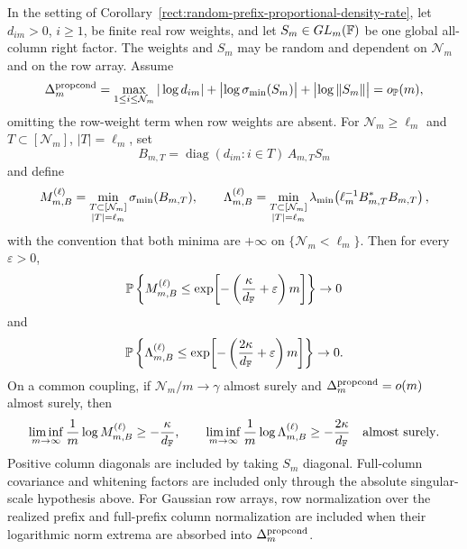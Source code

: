 \begin{corollary}\label{rect:random-prefix-proportional-conditioning-transfer}
In the setting of Corollary~\ref{rect:random-prefix-proportional-density-rate},
let \(d_{im}>0\), \(i\ge1\), be finite real row weights, and let
\(S_m\in GL_m(\mathbb{F})\) be one global all-column right factor.  The weights and
\(S_m\) may be random and dependent on \(\mathcal N_m\) and on the row array.
Assume
\[
  \Delta_m^{\rm propcond}
  =
  \max_{1\le i\le\mathcal N_m}|\log d_{im}|
  +\bigl|\log\sigma_{\min}(S_m)\bigr|+\bigl|\log\|S_m\|\bigr|
  =o_{\mathbb{P}}(m),
\]
omitting the row-weight term when row weights are absent.  For
\(\mathcal N_m\ge\ell_m\) and \(T\subset[\mathcal N_m]\), \(|T|=\ell_m\), set
\[
  B_{m,T}=\operatorname{diag}(d_{im}:i\in T)\,A_{m,T}S_m
\]
and define
\[
  M_{m,B}^{(\ell)}
  =
  \min_{\substack{T\subset[\mathcal N_m]\\ |T|=\ell_m}}\sigma_{\min}(B_{m,T}),
  \qquad
  \Lambda_{m,B}^{(\ell)}
  =
  \min_{\substack{T\subset[\mathcal N_m]\\ |T|=\ell_m}}
  \lambda_{\min}\!\left(\ell_m^{-1}B_{m,T}^*B_{m,T}\right),
\]
with the convention that both minima are \(+\infty\) on
\(\{\mathcal N_m<\ell_m\}\).  Then for every \(\varepsilon>0\),
\[
  \mathbb{P}\left\{
  M_{m,B}^{(\ell)}\le
  \exp\!\left[-\left(\frac{\kappa}{d_{\mathbb{F}}}+\varepsilon\right)m\right]
  \right\}\to0
\]
and
\[
  \mathbb{P}\left\{
  \Lambda_{m,B}^{(\ell)}\le
  \exp\!\left[-\left(\frac{2\kappa}{d_{\mathbb{F}}}+\varepsilon\right)m\right]
  \right\}\to0 .
\]
On a common coupling, if \(\mathcal N_m/m\to\gamma\) almost surely and
\(\Delta_m^{\rm propcond}=o(m)\) almost surely, then
\[
  \liminf_{m\to\infty}\frac1m\log M_{m,B}^{(\ell)}
  \ge-\frac{\kappa}{d_{\mathbb{F}}},
  \qquad
  \liminf_{m\to\infty}\frac1m\log \Lambda_{m,B}^{(\ell)}
  \ge-\frac{2\kappa}{d_{\mathbb{F}}}
  \quad\hbox{almost surely}.
\]
Positive column diagonals are included by taking \(S_m\) diagonal.  Full-column
covariance and whitening factors are included only through the absolute
singular-scale hypothesis above.  For Gaussian row arrays, row normalization
over the realized prefix and full-prefix column normalization are included when
their logarithmic norm extrema are absorbed into
\(\Delta_m^{\rm propcond}\).
\end{corollary}

